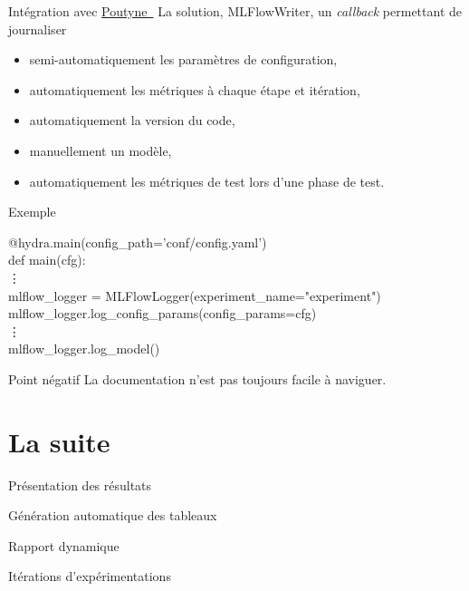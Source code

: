 \documentclass[aspectratio=169,10pt,xcolor=x11names,english,french]{beamer}
\makeatletter
\newenvironment{Scode}{%
	\def\FrameCommand##1{\hskip\@totalleftmargin
		\vrule width 3pt\colorbox{codebg}{\hspace{5pt}##1}%
		\hskip-\linewidth \hskip-\@totalleftmargin \hskip\columnwidth}%
	\MakeFramed {\advance\hsize-\width
		\@totalleftmargin\z@ \linewidth\hsize
		\advance\labelsep\fboxsep
		\@setminipage}%
}{\par\unskip\@minipagefalse\endMakeFramed}
\newcommand{\link}[2]{\href{#1}{#2~{\smaller\faExternalLink*}}}
\makeatother
\begin{document}
	\begin{frame}{Intégration avec \link{https://poutyne.org/}{Poutyne}}
		La solution, \color{bleu}MLFlowWriter\color{couleurpolice}, un \textit{callback} permettant de journaliser 
		\begin{itemize}
			\item semi-automatiquement les paramètres de configuration,
			\item automatiquement les métriques à chaque étape et itération,
			\item automatiquement la version du code,
			\item manuellement un modèle,
			\item automatiquement les métriques de test lors d'une phase de test.
		\end{itemize}
	\end{frame}

	\begin{frame}{Exemple}
		\begin{Scode}
			@hydra.main(config\_path='conf/config.yaml') \\
			def main(cfg): \\
			\quad \vdots \\
			\quad mlflow\_logger = MLFlowLogger(experiment\_name="experiment") \\
			\quad mlflow\_logger.log\_config\_params(config\_params=cfg) \\
			\quad \vdots \\
			\quad mlflow\_logger.log\_model()\\
		\end{Scode}
	\end{frame}

	\begin{frame}{Point négatif}
		La documentation n'est pas toujours facile à naviguer.
	\end{frame}

		
	\section{La suite}
	\begin{frame}{Présentation des résultats}
				\centering
		\begin{minipage}{0.49\linewidth}
				\centering
				\fontsize{35}{35}\faTable\vfil
				\vspace{1em}
				\normalsize Génération automatique des tableaux
		\end{minipage}
		\begin{minipage}{0.49\linewidth}
				\centering
				\fontsize{35}{35}\vfil
				\vspace{1em}
				\normalsize Rapport dynamique
		\end{minipage}
	\end{frame}
	\begin{frame}
		\centering
		\fontsize{35}{35}\faRefresh\vfil
		\vspace{1em}
		\normalsize Itérations d'expérimentations
	\end{frame}
	
\end{document}
